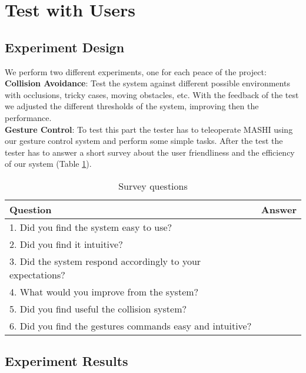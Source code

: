 \section{Test with Users}
\label{sec:test}

\subsection{Experiment Design}
We perform two different experiments, one for each peace of the project:\\


\textbf{Collision Avoidance}: Test the system against different possible environments with occlusions, tricky cases, moving obstacles, etc. With the feedback of the test we adjusted the different thresholds of the system, improving then the performance.\\


\textbf{Gesture Control}: To test this part the tester has to teleoperate MASHI using our gesture control system and perform some simple tasks. After the test the tester has to answer a short survey about the user friendliness and the efficiency of our system (Table \ref{tab:survey}).  

\begin{table}[!h]
	\centering
	\begin{tabular}{|l|l|}
		\hline
		\textbf{Question} & \textbf{Answer}			   \\
		\hline
		1. Did you find the system easy to use? 	 & \\
		2. Did you find it intuitive? 				 & \\
		3. Did the system respond accordingly to your expectations?  								 & \\ 
		4. What would you improve from the system? 	 & \\ 
		5. Did you find useful the collision system? & \\ 
		6. Did you find the gestures commands easy and intuitive? 									 & \\ \hline
	\end{tabular}
	\caption{Survey questions}
	\label{tab:survey}
\end{table}


\subsection{Experiment Results}